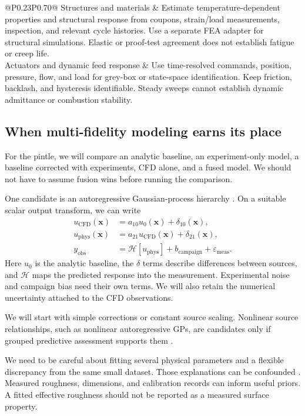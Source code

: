 \begin{longtable}{@{}P{0.23\linewidth}P{0.70\linewidth}@{}}
Structures and materials &
Estimate temperature-dependent properties and structural response from coupons, strain/load measurements, inspection, and relevant cycle histories. Use a separate FEA adapter for structural simulations. Elastic or proof-test agreement does not establish fatigue or creep life.\\
Actuators and dynamic feed response &
Use time-resolved commands, position, pressure, flow, and load for grey-box or state-space identification. Keep friction, backlash, and hysteresis identifiable. Steady sweeps cannot establish dynamic admittance or combustion stability.\\
\end{longtable}

\subsection{When multi-fidelity modeling earns its place}

For the pintle, we will compare an analytic baseline, an experiment-only model, a baseline corrected with experiments, CFD alone, and a fused model. We should not have to assume fusion wins before running the comparison.

One candidate is an autoregressive Gaussian-process hierarchy \cite{kennedy2000}. On a suitable scalar output transform, we can write
\begin{align}
u_{\mathrm{CFD}}(\mathbf{x})
  &= a_{10}u_0(\mathbf{x})+\delta_{10}(\mathbf{x}),\\
u_{\mathrm{phys}}(\mathbf{x})
  &= a_{21}u_{\mathrm{CFD}}(\mathbf{x})+\delta_{21}(\mathbf{x}),\\
y_{\mathrm{obs}}
  &= \mathcal{H}[u_{\mathrm{phys}}]+b_{\mathrm{campaign}}+\varepsilon_{\mathrm{meas}}.
\end{align}
Here $u_0$ is the analytic baseline, the $\delta$ terms describe differences between sources, and $\mathcal{H}$ maps the predicted response into the measurement. Experimental noise and campaign bias need their own terms. We will also retain the numerical uncertainty attached to the CFD observations.

We will start with simple corrections or constant source scaling. Nonlinear source relationships, such as nonlinear autoregressive GPs, are candidates only if grouped predictive assessment supports them \cite{perdikaris2017}.

We need to be careful about fitting several physical parameters and a flexible discrepancy from the same small dataset. Those explanations can be confounded \cite{brynjarsdottir2014}. Measured roughness, dimensions, and calibration records can inform useful priors. A fitted effective roughness should not be reported as a measured surface property.

